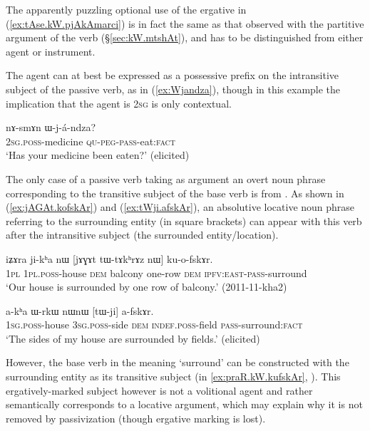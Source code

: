 The apparently puzzling optional use of the ergative in (\ref{ex:tAse.kW.pjAkAmarci}) is in fact the same as that observed with the partitive argument of the verb  (§\ref{sec:kW.mtshAt}), and has to be distinguished from either agent or instrument.

The agent can at best be expressed as a possessive prefix on the intransitive subject of the passive verb, as in (\ref{ex:Wjandza}), though in this example the implication that the agent is \textsc{2sg} is only contextual.

\begin{exe}
\ex \label{ex:Wjandza}
 \gll nɤ-smɤn ɯ-j-á-ndza? \\
 \textsc{2sg}.\textsc{poss}-medicine \textsc{qu}-\textsc{peg}-\textsc{pass}-eat:\textsc{fact} \\
 \glt `Has your medicine been eaten?' (elicited)
\end{exe}


The only case of a passive verb taking as argument an overt noun phrase corresponding to the transitive subject of the base verb is  from . As shown in (\ref{ex:jAGAt.kofskAr}) and (\ref{ex:tWji.afskAr}), an absolutive locative noun phrase referring to the surrounding entity (in square brackets) can appear with this verb after the intransitive subject (the surrounded entity/location).

\begin{exe}
\ex \label{ex:jAGAt.kofskAr}
 \gll iʑɤra ji-kʰa nɯ [jɤɣɤt tɯ-tɤkʰrɤz nɯ] ku-o-fskɤr. \\
 \textsc{1pl} \textsc{1pl}.\textsc{poss}-house \textsc{dem} balcony one-row \textsc{dem} \textsc{ipfv}:\textsc{east}-\textsc{pass}-surround \\
\glt `Our house is surrounded by one row of balcony.' (2011-11-kha2)
\end{exe}

\begin{exe}
\ex \label{ex:tWji.afskAr}
 \gll a-kʰa ɯ-rkɯ nɯnɯ [tɯ-ji] a-fskɤr.\\
\textsc{1sg}.\textsc{poss}-house \textsc{3sg}.\textsc{poss}-side \textsc{dem} \textsc{indef}.\textsc{poss}-field \textsc{pass}-surround:\textsc{fact}\\
\glt `The sides of my house are surrounded by fields.' (elicited)
\end{exe}

However, the base verb   in the meaning `surround' can be constructed with the surrounding entity as its transitive subject (in \ref{ex:praR.kW.kufskAr}, ). This ergatively-marked subject however is not a volitional agent and rather semantically corresponds to a locative argument, which may explain why it is not removed by passivization (though ergative marking is lost).


